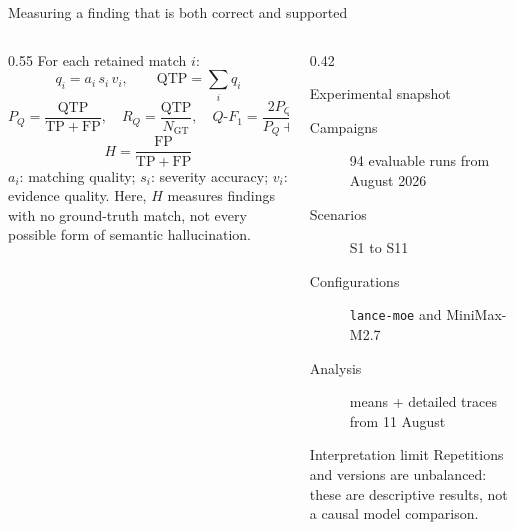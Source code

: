 \documentclass[aspectratio=169,10pt]{beamer}
\begin{document}
\begin{frame}{Measuring a finding that is both correct and supported}
  \begin{columns}[T,onlytextwidth]
    \begin{column}{0.55\textwidth}
      For each retained match $i$:
      \[
        q_i=a_i\,s_i\,v_i, \qquad \mathrm{QTP}=\sum_i q_i
      \]
      \[
        P_Q=\frac{\mathrm{QTP}}{\mathrm{TP}+\mathrm{FP}},\quad
        R_Q=\frac{\mathrm{QTP}}{N_{\mathrm{GT}}},\quad
        Q\text{-}F_1=\frac{2P_QR_Q}{P_Q+R_Q}
      \]
      \[
        H=\frac{\mathrm{FP}}{\mathrm{TP}+\mathrm{FP}}
      \]
      \scriptsize $a_i$: matching quality; $s_i$: severity accuracy; $v_i$:
      evidence quality. Here, $H$ measures findings with no ground-truth match,
      not every possible form of semantic hallucination.
    \end{column}
    \begin{column}{0.42\textwidth}
      \begin{block}{Experimental snapshot}
        \begin{description}
          \item[Campaigns] 94 evaluable runs from August 2026
          \item[Scenarios] S1 to S11
          \item[Configurations] \texttt{lance-moe} and MiniMax-M2.7
          \item[Analysis] means + detailed traces from 11 August
        \end{description}
      \end{block}
      \begin{alertblock}{Interpretation limit}
        Repetitions and versions are unbalanced: these are descriptive results,
        not a causal model comparison.
      \end{alertblock}
    \end{column}
  \end{columns}
\end{frame}
\end{document}
